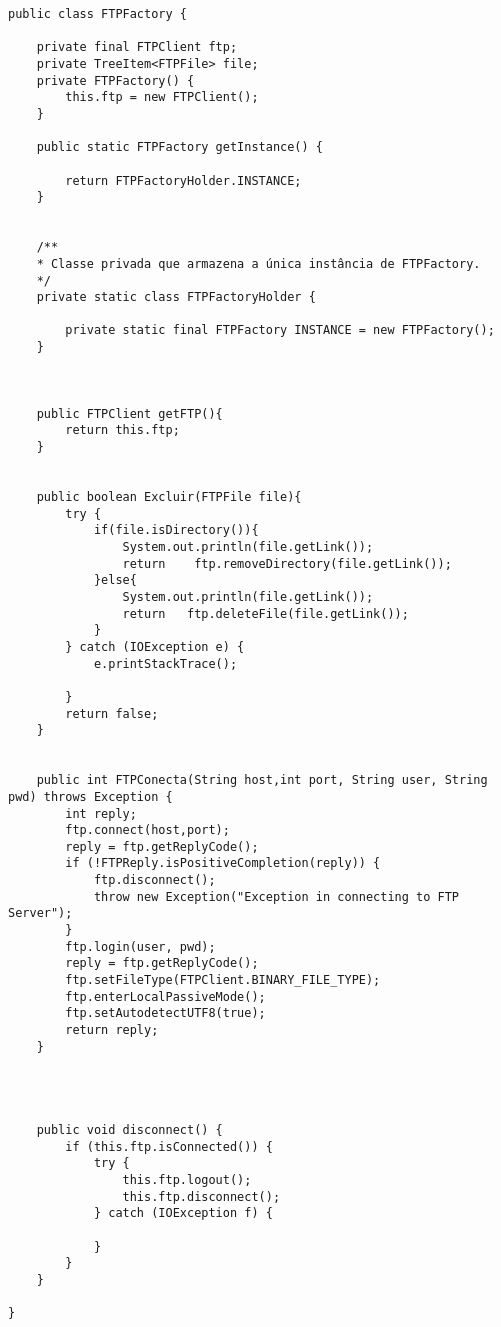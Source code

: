 \documentclass[12pt]{article}
\begin{document}
\begin{lstlisting}
public class FTPFactory {
	
	private final FTPClient ftp;
	private TreeItem<FTPFile> file;
	private FTPFactory() {
		this.ftp = new FTPClient();
	}
	
	public static FTPFactory getInstance() {
		
		return FTPFactoryHolder.INSTANCE;
	}
	
	
	/**
	* Classe privada que armazena a única instância de FTPFactory.
	*/
	private static class FTPFactoryHolder {
		
		private static final FTPFactory INSTANCE = new FTPFactory();
	}
	
	
	
	public FTPClient getFTP(){
		return this.ftp;
	}
	
	
	public boolean Excluir(FTPFile file){
		try {
			if(file.isDirectory()){
				System.out.println(file.getLink());
				return    ftp.removeDirectory(file.getLink());
			}else{
				System.out.println(file.getLink());
				return   ftp.deleteFile(file.getLink());
			}
		} catch (IOException e) {
			e.printStackTrace();
			
		}
		return false;
	}
	
	
	public int FTPConecta(String host,int port, String user, String pwd) throws Exception {
		int reply;
		ftp.connect(host,port);
		reply = ftp.getReplyCode();
		if (!FTPReply.isPositiveCompletion(reply)) {
			ftp.disconnect();
			throw new Exception("Exception in connecting to FTP Server");
		}
		ftp.login(user, pwd);
		reply = ftp.getReplyCode();
		ftp.setFileType(FTPClient.BINARY_FILE_TYPE);
		ftp.enterLocalPassiveMode();
		ftp.setAutodetectUTF8(true);
		return reply;
	}
	
	
	
	
	public void disconnect() {
		if (this.ftp.isConnected()) {
			try {
				this.ftp.logout();
				this.ftp.disconnect();
			} catch (IOException f) {
				
			}
		}
	}
	
}
\end{lstlisting}
\end{document}
